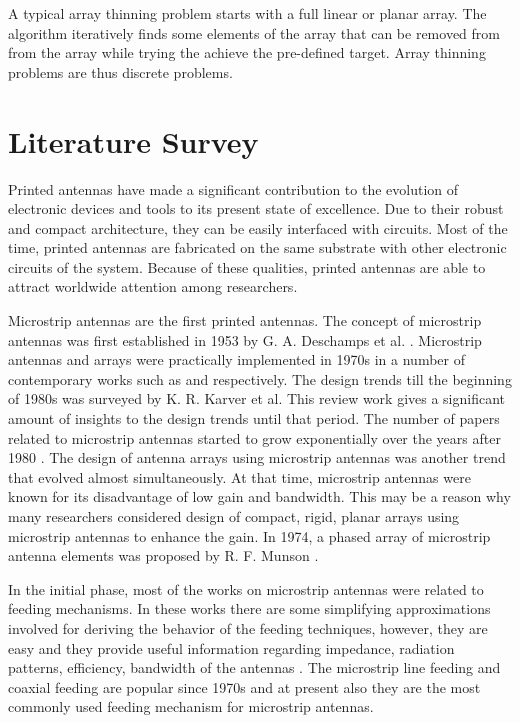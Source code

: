 A typical array thinning problem starts with a full linear or planar array. The algorithm iteratively finds some elements of the array that can be removed from from the array while trying the achieve the pre-defined target. Array thinning problems are thus discrete problems.

\section{Literature Survey} \label{c1sec_litserv}
Printed antennas have made a significant contribution to the evolution of electronic devices and tools to its present state of excellence. Due to their robust and compact architecture, they can be easily interfaced with circuits. Most of the time, printed antennas are fabricated on the same substrate with other electronic circuits of the system. Because of these qualities, printed antennas are able to attract worldwide attention among researchers.

Microstrip antennas are the first printed antennas. The concept of microstrip antennas was first established in 1953 by G. A. Deschamps et al. \cite{mpa00}. Microstrip antennas and arrays were practically implemented in 1970s in a number of contemporary works such as \cite{mpa02} and \cite{mpa01} respectively. The design trends till the beginning of 1980s was surveyed by K. R. Karver et al\cite{mpaSurvTech}. This review work gives a significant amount of insights to the design trends until that period. The number of papers related to microstrip antennas started to grow exponentially over the years after 1980 \cite{mpaHist01}. The design of antenna arrays using microstrip antennas was another trend that evolved almost simultaneously. At that time, microstrip antennas were known for its disadvantage of low gain and bandwidth. This may be a reason why many researchers considered design of compact, rigid, planar arrays using microstrip antennas to enhance the gain. In 1974, a phased array of microstrip antenna elements was proposed by R. F. Munson \cite{txmPhasedArray}.

In the initial phase, most of the works on microstrip antennas were related to feeding mechanisms. In these works there are some simplifying approximations involved for deriving the behavior of the feeding techniques, however, they are easy and they provide useful information regarding impedance, radiation patterns, efficiency, bandwidth of the antennas \cite{mpaReview1992}. The microstrip line feeding and coaxial feeding are popular since 1970s and at present also they are the most commonly used feeding mechanism for microstrip antennas.

